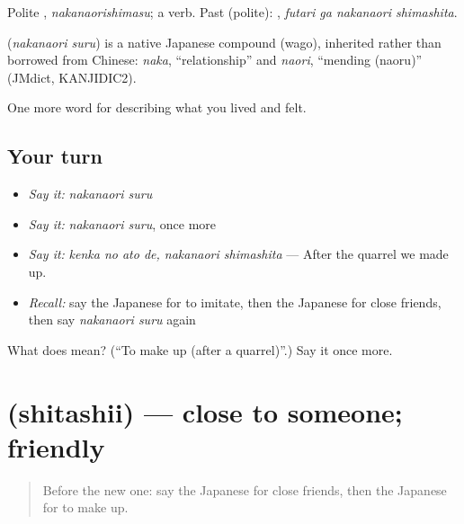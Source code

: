Polite \textbf{}, \emph{nakanaorishimasu}; a  verb. Past (polite): \textbf{ }, \emph{futari ga nakanaori shimashita}.

\begin{cousinweb}
\textbf{} (\emph{nakanaori suru}) is a native Japanese compound (wago), inherited rather than borrowed from Chinese: \emph{naka}, \textquotedblleft{}relationship\textquotedblright{} and \emph{naori}, \textquotedblleft{}mending (naoru)\textquotedblright{} (JMdict, KANJIDIC2).
\end{cousinweb}

\begin{grammarlens}[title={What you've built}]
One more word for describing what you lived and felt.
\end{grammarlens}

\subsection*{Your turn}
\begin{itemize}
\raggedright
  \item \emph{Say it:} \emph{nakanaori suru}
  \item \emph{Say it:} \emph{nakanaori suru}, once more
  \item \emph{Say it:} \emph{kenka no ato de, nakanaori shimashita} — After the quarrel we made up.
  \item \emph{Recall:} say the Japanese for to imitate, then the Japanese for close friends, then say \emph{nakanaori suru} again
\end{itemize}

\begin{tcolorbox}[breakable,colback=teal!4,colframe=teal!35!black,title={Before you move on}]
What does  mean? (\textquotedblleft{}To make up (after a quarrel)\textquotedblright{}.) Say it once more.
\end{tcolorbox}
\section[\texorpdfstring{\ja{したしい} (shitashii)}{したしい (shitashii)}]{ (shitashii) — close to someone; friendly}

\label{lesson:JA-C479-shitashii}



\begin{quote}
Before the new one: say the Japanese for close friends, then the Japanese for to make up.
\end{quote}

